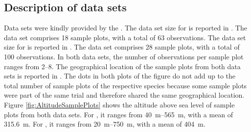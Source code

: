 \subsection{Description of data sets}

Data sets were kindly provided by the \NWFVA{}. The data set size for \Beech{} is reported in .  The data set comprises 18 sample plots, with a total of 63 observations.  The data set size for \Spruce{} is reported in .  The data set comprises 28 sample plots, with a total of 100 observations.  In both data sets, the number of observations per sample plot ranges from \numrange{2}{8}.  The geographical location of the sample plots from both data sets is reported in .  The dots in both plots of the figure do not add up to the total number of sample plots of the respective species because some sample plots were part of the same trial and therefore shared the same geographical location.
Figure \ref{fig:AltitudeSamplePlots} shows the altitude above sea level of sample plots from both data sets.  For \Beech{}, it ranges from \SIrange{40}{565}{\meter}, with a mean of \SI{315.6}{\meter}.  For \Spruce{}, it ranges from \SIrange{20}{750}{\meter}, with a mean of \SI{404}{\meter}.

